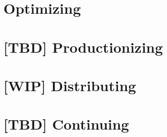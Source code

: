 \documentclass[12pt, a4paper, twoside]{extreport}
\begin{document}
\newpage
\section{Optimizing}









\newpage
\section{[TBD] Productionizing}



\newpage
\section{[WIP] Distributing}





\newpage
\section*{[TBD] Continuing}



\thispagestyle{empty}



~
\end{document}
